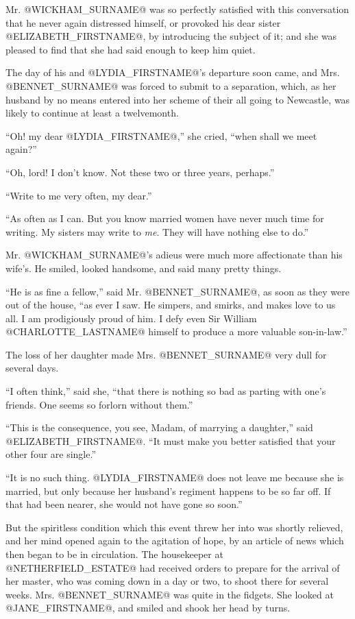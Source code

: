Mr. @WICKHAM_SURNAME@ was so perfectly satisfied with this conversation that he
never again distressed himself, or provoked his dear sister @ELIZABETH_FIRSTNAME@,
by introducing the subject of it; and she was pleased to find that she
had said enough to keep him quiet.

The day of his and @LYDIA_FIRSTNAME@'s departure soon came, and Mrs. @BENNET_SURNAME@ was
forced to submit to a separation, which, as her husband by no means
entered into her scheme of their all going to Newcastle, was likely to
continue at least a twelvemonth.

``Oh! my dear @LYDIA_FIRSTNAME@,'' she cried, ``when shall we meet again?''

``Oh, lord! I don't know. Not these two or three years, perhaps.''

``Write to me very often, my dear.''

``As often as I can. But you know married women have never much time for
writing. My sisters may write to \textit{me}. They will have nothing else to
do.''

Mr. @WICKHAM_SURNAME@'s adieus were much more affectionate than his wife's. He
smiled, looked handsome, and said many pretty things.

``He is as fine a fellow,'' said Mr. @BENNET_SURNAME@, as soon as they were out of
the house, ``as ever I saw. He simpers, and smirks, and makes love to
us all. I am prodigiously proud of him. I defy even Sir William @CHARLOTTE_LASTNAME@
himself to produce a more valuable son-in-law.''

The loss of her daughter made Mrs. @BENNET_SURNAME@ very dull for several days.

``I often think,'' said she, ``that there is nothing so bad as parting with
one's friends. One seems so forlorn without them.''

``This is the consequence, you see, Madam, of marrying a daughter,'' said
@ELIZABETH_FIRSTNAME@. ``It must make you better satisfied that your other four are
single.''

``It is no such thing. @LYDIA_FIRSTNAME@ does not leave me because she is married,
but only because her husband's regiment happens to be so far off. If
that had been nearer, she would not have gone so soon.''

But the spiritless condition which this event threw her into was shortly
relieved, and her mind opened again to the agitation of hope, by an
article of news which then began to be in circulation. The housekeeper
at @NETHERFIELD_ESTATE@ had received orders to prepare for the arrival of her
master, who was coming down in a day or two, to shoot there for several
weeks. Mrs. @BENNET_SURNAME@ was quite in the fidgets. She looked at @JANE_FIRSTNAME@, and
smiled and shook her head by turns.

